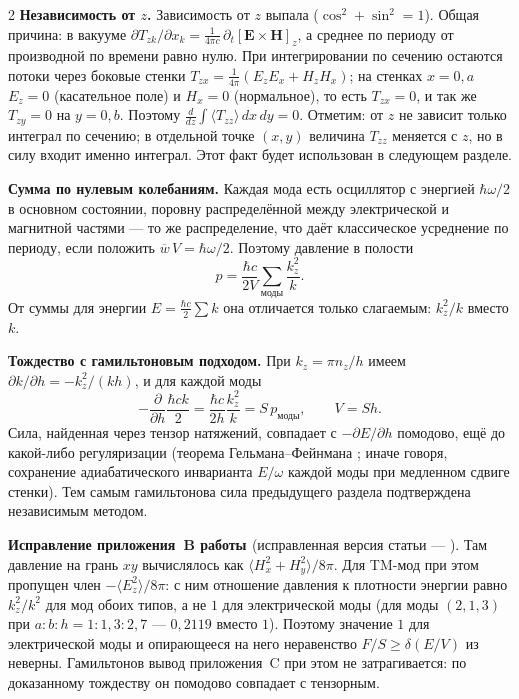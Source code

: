 \documentclass[twoside, 10pt]{article}
\begin{document}
\begin{multicols}{2}
\textbf{Независимость от \(z\).} Зависимость от \(z\) выпала (\(\cos^2+\sin^2=1\)). Общая причина:
в вакууме \(\partial T_{zk}/\partial x_k=\frac1{4\pi c}\,\partial_t[\mathbf E\times\mathbf H]_z\),
а среднее по периоду от производной по времени равно нулю. При интегрировании по сечению остаются
потоки через боковые стенки \(T_{zx}=\frac1{4\pi}(E_zE_x+H_zH_x)\); на стенках \(x=0,a\)
\(E_z=0\) (касательное поле) и \(H_x=0\) (нормальное), то есть \(T_{zx}=0\), и так же
\(T_{zy}=0\) на \(y=0,b\). Поэтому \(\frac{d}{dz}\int\langle T_{zz}\rangle\,dx\,dy=0\). Отметим:
от \(z\) не зависит только интеграл по сечению; в отдельной точке \((x,y)\) величина \(T_{zz}\)
меняется с \(z\), но в силу входит именно интеграл. Этот факт будет использован в следующем
разделе.

\textbf{Сумма по нулевым колебаниям.} Каждая мода есть осциллятор с энергией \(\hbar\omega/2\) в
основном состоянии, поровну распределённой между электрической и магнитной частями --- то же
распределение, что даёт классическое усреднение по периоду, если положить
\(\overline w\,V=\hbar\omega/2\). Поэтому давление в полости
\[
p=\frac{\hbar c}{2V}\sum_{\text{моды}}\frac{k_z^2}{k}.
\]
От суммы для энергии \(E=\frac{\hbar c}{2}\sum k\) она отличается только слагаемым: \(k_z^2/k\)
вместо \(k\).

\textbf{Тождество с гамильтоновым подходом.} При \(k_z=\pi n_z/h\) имеем
\(\partial k/\partial h=-k_z^2/(kh)\), и для каждой моды
\[
-\frac{\partial}{\partial h}\frac{\hbar ck}{2}=\frac{\hbar c}{2h}\frac{k_z^2}{k}=S\,p_{\text{моды}},\qquad V=Sh .
\]
Сила, найденная через тензор натяжений, совпадает с \(-\partial E/\partial h\) помодово, ещё до
какой-либо регуляризации (теорема Гельмана--Фейнмана \cite{Feynman1939}; иначе говоря,
сохранение адиабатического инварианта \(E/\omega\) каждой моды при медленном сдвиге стенки).
Тем самым гамильтонова сила предыдущего раздела подтверждена независимым методом.

\textbf{Исправление приложения~B работы \cite{Drozdov2024}} (исправленная версия статьи --- \cite{Drozdov2024fix}). Там давление на грань \(xy\)
вычислялось как \(\langle H_x^2+H_y^2\rangle/8\pi\). Для TM-мод при этом пропущен член
\(-\langle E_z^2\rangle/8\pi\): с ним отношение давления к плотности энергии равно \(k_z^2/k^2\)
для мод обоих типов, а не \(1\) для электрической моды (для моды \((2,1,3)\) при
\(a:b:h=1:1{,}3:2{,}7\) --- \(0{,}2119\) вместо \(1\)). Поэтому значение \(1\) для электрической
моды и опирающееся на него неравенство \(F/S\ge\delta(E/V)\) из \cite{Drozdov2024} неверны.
Гамильтонов вывод приложения~C при этом не затрагивается: по доказанному тождеству он помодово
совпадает с тензорным.


\end{multicols}
\end{document}
